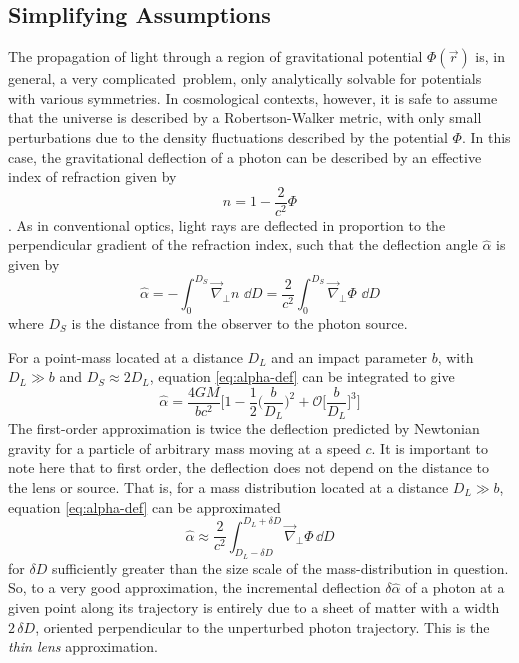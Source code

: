 \subsection{Simplifying Assumptions}
\label{sec:lensing_simplification}
The propagation of light through a region of gravitational potential
$\Phi(\vec{r})$ is, in general, a very complicated\ problem, only analytically
solvable for potentials with various symmetries.  In cosmological contexts,
however, it is safe to assume that the universe is described by a
Robertson-Walker metric, with only small perturbations due to the density
fluctuations described by the potential $\Phi$.  In this case, the
gravitational deflection of a photon can be described by an effective
index of refraction given by
\begin{equation}
  n = 1-\frac{2}{c^2}\Phi 
\end{equation}
\citep[see][and references therein]{narayan1996lectures}.
As in conventional optics, light rays are deflected in proportion to the
perpendicular gradient of the refraction index, such that the deflection angle
$\hat{\alpha}$ is given by
\begin{equation}
  \label{eq:alpha-def}
  \hat{\alpha} = -\int_0^{D_S} \vec{\nabla}_\perp n \,\,\dd D
  = \frac{2}{c^2}\int_0^{D_S} \vec{\nabla}_\perp\Phi\,\,\dd D
\end{equation}
where $D_S$ is the distance from the observer to the photon source.  

For a point-mass located at a distance $D_L$ and an impact parameter $b$, with $D_L \gg b$ and $D_S \approx 2D_L$, equation \ref{eq:alpha-def} can be integrated to give
\begin{equation}
  \hat{\alpha} = \frac{4GM}{bc^2}\Bigg[1 - \frac{1}{2}\bigg(\frac{b}{D_L}\bigg)^2 + \mathcal{O}\bigg[\frac{b}{D_L}\bigg]^3 \Bigg]
\end{equation}
The first-order approximation is twice the deflection predicted by Newtonian gravity for a particle of arbitrary mass moving at a speed $c$.  It is important to note here that to first order, the deflection does not depend on the distance to the lens or source.  That is, for a mass distribution located at a distance $D_L \gg b$, equation \ref{eq:alpha-def} can be approximated
\begin{equation}
  \label{eq:alpha-def-approx}
  \hat{\alpha} \approx \frac{2}{c^2}\int_{D_L-\delta D}^{D_L+\delta D} \vec{\nabla}_\perp\Phi\,\dd D
\end{equation}
for $\delta D$ sufficiently greater than the size scale of the mass-distribution in question.
So, to a very good approximation, the incremental deflection $\delta \hat{\alpha}$ of a photon at a given point along its trajectory is entirely due to a sheet of matter with a width $2\,\delta D$, oriented perpendicular to the unperturbed photon trajectory.  This is the {\it thin lens} approximation.

